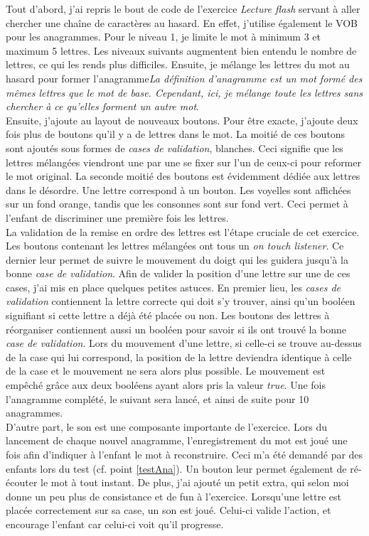 Tout d'abord, j'ai repris le bout de code de l'exercice \textit{Lecture flash} servant à aller chercher une chaîne de caractères au hasard. En effet, j'utilise également le VOB pour les anagrammes. Pour le niveau 1, je limite le mot à minimum 3 et maximum 5 lettres. Les niveaux suivants augmentent bien entendu le nombre de lettres, ce qui les rends plus difficiles. Ensuite, je mélange les lettres du mot au hasard pour former l'anagramme\textit{La définition d'anagramme est un mot formé des mêmes lettres que le mot de base. Cependant, ici, je mélange toute les lettres sans chercher à ce qu'elles forment un autre mot}.\\

Ensuite, j'ajoute au layout de nouveaux boutons. Pour être exacte, j'ajoute deux fois plus de boutons qu'il y a de lettres dans le mot. La moitié de ces boutons sont ajoutés sous formes de \textit{cases de validation}, blanches. Ceci signifie que les lettres mélangées viendront une par une se fixer sur l'un de ceux-ci pour reformer le mot original. La seconde moitié des boutons est évidemment dédiée aux lettres dans le désordre. Une lettre correspond à un bouton. Les voyelles sont affichées sur un fond orange, tandis que les consonnes sont sur fond vert. Ceci permet à l'enfant de discriminer une première fois les lettres.\\

La validation de la remise en ordre des lettres est l'étape cruciale de cet exercice. Les boutons contenant les lettres mélangées ont tous un \textit{on touch listener}. Ce dernier leur permet de suivre le mouvement du doigt qui les guidera jusqu'à la bonne \textit{case de validation}. Afin de valider la position d'une lettre sur une de ces cases, j'ai mis en place quelques petites astuces. En premier lieu, les \textit{cases de validation} contiennent la lettre correcte qui doit s'y trouver, ainsi qu'un booléen signifiant si cette lettre a déjà été placée ou non. Les boutons des lettres à réorganiser contiennent aussi un booléen pour savoir si ils ont trouvé la bonne \textit{case de validation}. Lors du mouvement d'une lettre, si celle-ci se trouve au-dessus de la case qui lui correspond, la position de la lettre deviendra identique à celle de la case et le mouvement ne sera alors plus possible. Le mouvement est empêché grâce aux deux booléens ayant alors pris la valeur \textit{true}. Une fois l'anagramme complété, le suivant sera lancé, et ainsi de suite pour 10 anagrammes.\\

D'autre part, le son est une composante importante de l'exercice. Lors du lancement de chaque nouvel anagramme, l'enregistrement du mot est joué une fois afin d'indiquer à l'enfant le mot à reconstruire. Ceci m'a été demandé par des enfants lors du test (cf. point \ref{testAna}). Un bouton leur permet également de ré-écouter le mot à tout instant. De plus, j'ai ajouté un petit extra, qui selon moi donne un peu plus de consistance et de fun à l'exercice. Lorsqu'une lettre est placée correctement sur sa case, un son est joué. Celui-ci valide l'action, et encourage l'enfant car celui-ci voit qu'il progresse.\\

